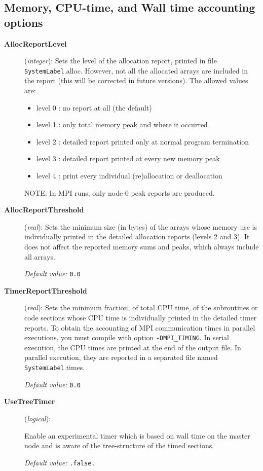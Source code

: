 \subsection{Memory, CPU-time, and Wall time accounting options}
\begin{description}

\item[\textbf{AllocReportLevel}] (\textit{integer}):
Sets the level of the allocation report, printed in file
\texttt{SystemLabel}.alloc. However, not all the allocated arrays are 
included in the report (this will be corrected in future versions).
The allowed values are:
\begin{itemize}
\item
  level 0 : no report at all (the default)
\item
  level 1 : only total memory peak and where it occurred
\item
  level 2 : detailed report printed only at
            normal program termination
\item
  level 3 : detailed report printed at every new memory peak
\item
  level 4 : print every individual (re)allocation or deallocation
\end{itemize}

NOTE: In MPI runs, only node-0 peak reports are produced.

\item[\textbf{AllocReportThreshold}] (\textit{real}): 
Sets the minimum size (in bytes) of the arrays whose memory use
is individually printed in the detailed allocation reports 
(levels 2 and 3). It does not affect the reported memory sums
and peaks, which always include all arrays.

\textit{Default value:} \texttt{0.0}


\item[\textbf{TimerReportThreshold}] (\textit{real}): 
Sets the minimum fraction, of total CPU time, of the subroutines or
code sections whose CPU time is individually printed in the detailed 
timer reports. To obtain the accounting of MPI communication times
in parallel executions, you must compile with option \texttt{-DMPI\_TIMING}.
In serial execution, the CPU times are printed at the end of the
output file. In parallel execution, they are reported in a separated
file named \texttt{SystemLabel}.times.

\textit{Default value:} \texttt{0.0}

\item[\textbf{UseTreeTimer}] (\textit{logical}): 

Enable an experimental timer which is based on wall time on the master
node and is aware of the tree-structure of the timed sections.

\textit{Default value:} \texttt{.false.}


\end{description}


